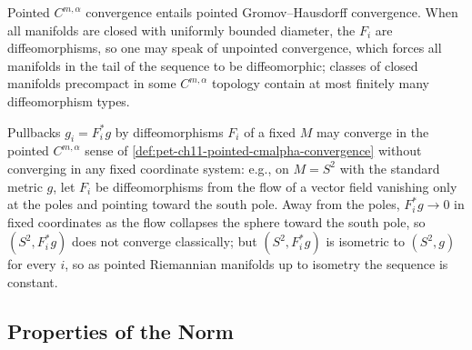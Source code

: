 \begin{remark}
  \label{rem:pet-ch11-cmalpha-convergence-implies-gh}
  Pointed $C^{m,\alpha}$ convergence entails pointed Gromov--Hausdorff
  convergence. When all manifolds are closed with uniformly bounded
  diameter, the $F_i$ are diffeomorphisms, so one may speak of unpointed
  convergence, which forces all manifolds in the tail of the sequence to be
  diffeomorphic; classes of closed manifolds precompact in some $C^{m,\alpha}$
  topology contain at most finitely many diffeomorphism types.
\end{remark}

\begin{remark}
  \label{rem:pet-ch11-cmalpha-convergence-pullback-warning}
  Pullbacks $g_i=F_i^*g$ by diffeomorphisms $F_i$ of a fixed $M$ may converge
  in the pointed $C^{m,\alpha}$ sense of
  \cref{def:pet-ch11-pointed-cmalpha-convergence} without converging in any
  fixed coordinate system: e.g., on $M=S^2$ with the standard metric $g$, let
  $F_i$ be diffeomorphisms from the flow of a vector field vanishing only at
  the poles and pointing toward the south pole. Away from the poles,
  $F_i^*g\to0$ in fixed coordinates as the flow collapses the sphere toward
  the south pole, so $(S^2,F_i^*g)$ does not converge classically; but
  $(S^2,F_i^*g)$ is isometric to $(S^2,g)$ for every $i$, so as pointed
  Riemannian manifolds up to isometry the sequence is constant.
\end{remark}

\subsection{Properties of the Norm}

